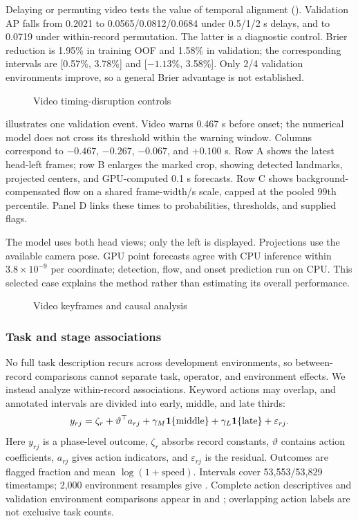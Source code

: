 Delaying or permuting video tests the value of temporal alignment (). Validation AP falls from 0.2021 to 0.0565/0.0812/0.0684 under 0.5/1/2 s delays, and to 0.0719 under within-record permutation. The latter is a diagnostic control. Brier reduction is 1.95\% in training OOF and 1.58\% in validation; the corresponding intervals are [0.57\%, 3.78\%] and [$-1.13$\%, 3.58\%]. Only 2/4 validation environments improve, so a general Brier advantage is not established.
\begin{figure}[!htbp]
\centering
{}
\caption{Video timing-disruption controls}
\label{fig:controls}
\end{figure}

 illustrates one validation event. Video warns 0.467 s before onset; the numerical model does not cross its threshold within the warning window. Columns correspond to $-0.467$, $-0.267$, $-0.067$, and $+0.100$ s. Row A shows the latest head-left frames; row B enlarges the marked crop, showing detected landmarks, projected centers, and GPU-computed 0.1 s forecasts. Row C shows background-compensated flow on a shared frame-width/s scale, capped at the pooled 99th percentile. Panel D links these times to probabilities, thresholds, and supplied flags.

The model uses both head views; only the left is displayed. Projections use the available camera pose. GPU point forecasts agree with CPU inference within $3.8\times10^{-9}$ per coordinate; detection, flow, and onset prediction run on CPU. This selected case explains the method rather than estimating its overall performance.
\begin{figure}[!htbp]
\centering
{}
\caption{Video keyframes and causal analysis}
\label{fig:frames}
\end{figure}
\subsubsection{Task and stage associations}
No full task description recurs across development environments, so between-record comparisons cannot separate task, operator, and environment effects. We instead analyze within-record associations. Keyword actions may overlap, and annotated intervals are divided into early, middle, and late thirds:
\begin{equation}
y_{rj}=\zeta_r+\vartheta^\top a_{rj}
+\gamma_M\mathbf{1}\{\text{middle}\}+\gamma_L\mathbf{1}\{\text{late}\}+\varepsilon_{rj}.
\label{eq:context}
\end{equation}
\noindent Here $y_{rj}$ is a phase-level outcome, $\zeta_r$ absorbs record constants, $\vartheta$ contains action coefficients, $a_{rj}$ gives action indicators, and $\varepsilon_{rj}$ is the residual. Outcomes are flagged fraction and mean $\log(1+\mathrm{speed})$. Intervals cover 53,553/53,829 timestamps; 2,000 environment resamples give . Complete action descriptives and validation environment comparisons appear in  and ; overlapping action labels are not exclusive task counts.

